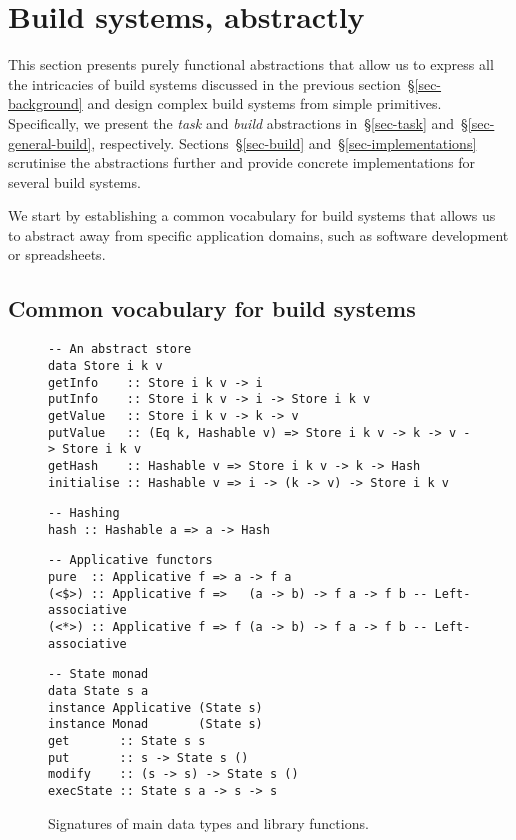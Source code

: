 \section{Build systems, abstractly}\label{sec-abstractions}

This section presents purely functional abstractions that allow us to express
all the intricacies of build systems discussed in the previous
section~\S\ref{sec-background} and design complex build systems from simple
primitives. Specifically, we present the \emph{task} and \emph{build}
abstractions in~\S\ref{sec-task} and~\S\ref{sec-general-build}, respectively.
Sections~\S\ref{sec-build} and~\S\ref{sec-implementations} scrutinise the
abstractions further and provide concrete implementations for several build
systems.

We start by establishing a common vocabulary for build systems that allows
us to abstract away from specific application domains, such as software
development or spreadsheets.

\subsection{Common vocabulary for build systems}\label{sec-vocabulary}

\begin{figure}
\begin{verbatim}
-- An abstract store
data Store i k v
getInfo    :: Store i k v -> i
putInfo    :: Store i k v -> i -> Store i k v
getValue   :: Store i k v -> k -> v
putValue   :: (Eq k, Hashable v) => Store i k v -> k -> v -> Store i k v
getHash    :: Hashable v => Store i k v -> k -> Hash
initialise :: Hashable v => i -> (k -> v) -> Store i k v
\end{verbatim}
\vspace{1mm}
\begin{verbatim}
-- Hashing
hash :: Hashable a => a -> Hash
\end{verbatim}
\vspace{1mm}
\begin{verbatim}
-- Applicative functors
pure  :: Applicative f => a -> f a
(<$>) :: Applicative f =>   (a -> b) -> f a -> f b -- Left-associative
(<*>) :: Applicative f => f (a -> b) -> f a -> f b -- Left-associative
\end{verbatim}
\vspace{1mm}
\begin{verbatim}
-- State monad
data State s a
instance Applicative (State s)
instance Monad       (State s)
get       :: State s s
put       :: s -> State s ()
modify    :: (s -> s) -> State s ()
execState :: State s a -> s -> s
\end{verbatim}
\vspace{-2mm}
\caption{Signatures of main data types and library functions.}\label{fig-types}
\vspace{-4mm}
\end{figure}

